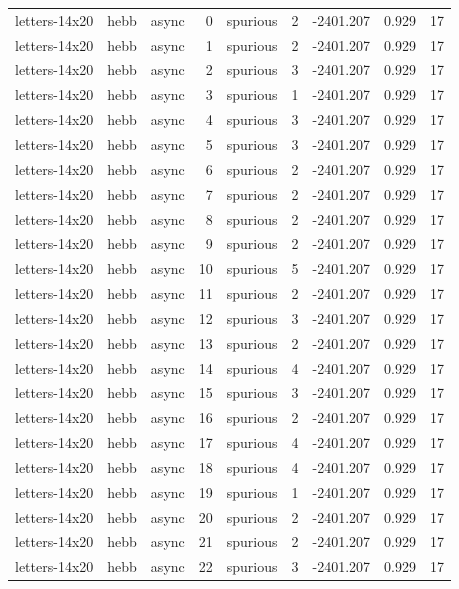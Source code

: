 \begin{tabular}{lllrlrrrr}
letters-14x20 & hebb & async & 0 & spurious & 2 & -2401.207 & 0.929 & 17 \\
letters-14x20 & hebb & async & 1 & spurious & 2 & -2401.207 & 0.929 & 17 \\
letters-14x20 & hebb & async & 2 & spurious & 3 & -2401.207 & 0.929 & 17 \\
letters-14x20 & hebb & async & 3 & spurious & 1 & -2401.207 & 0.929 & 17 \\
letters-14x20 & hebb & async & 4 & spurious & 3 & -2401.207 & 0.929 & 17 \\
letters-14x20 & hebb & async & 5 & spurious & 3 & -2401.207 & 0.929 & 17 \\
letters-14x20 & hebb & async & 6 & spurious & 2 & -2401.207 & 0.929 & 17 \\
letters-14x20 & hebb & async & 7 & spurious & 2 & -2401.207 & 0.929 & 17 \\
letters-14x20 & hebb & async & 8 & spurious & 2 & -2401.207 & 0.929 & 17 \\
letters-14x20 & hebb & async & 9 & spurious & 2 & -2401.207 & 0.929 & 17 \\
letters-14x20 & hebb & async & 10 & spurious & 5 & -2401.207 & 0.929 & 17 \\
letters-14x20 & hebb & async & 11 & spurious & 2 & -2401.207 & 0.929 & 17 \\
letters-14x20 & hebb & async & 12 & spurious & 3 & -2401.207 & 0.929 & 17 \\
letters-14x20 & hebb & async & 13 & spurious & 2 & -2401.207 & 0.929 & 17 \\
letters-14x20 & hebb & async & 14 & spurious & 4 & -2401.207 & 0.929 & 17 \\
letters-14x20 & hebb & async & 15 & spurious & 3 & -2401.207 & 0.929 & 17 \\
letters-14x20 & hebb & async & 16 & spurious & 2 & -2401.207 & 0.929 & 17 \\
letters-14x20 & hebb & async & 17 & spurious & 4 & -2401.207 & 0.929 & 17 \\
letters-14x20 & hebb & async & 18 & spurious & 4 & -2401.207 & 0.929 & 17 \\
letters-14x20 & hebb & async & 19 & spurious & 1 & -2401.207 & 0.929 & 17 \\
letters-14x20 & hebb & async & 20 & spurious & 2 & -2401.207 & 0.929 & 17 \\
letters-14x20 & hebb & async & 21 & spurious & 2 & -2401.207 & 0.929 & 17 \\
letters-14x20 & hebb & async & 22 & spurious & 3 & -2401.207 & 0.929 & 17 \\

\end{tabular}
